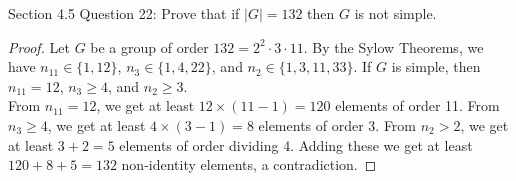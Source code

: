 Section 4.5 Question 22: Prove that if $|G|=132$ then $G$ is not simple.

\begin{proof}
  Let $G$ be a group of order $132=2^2\cdot3\cdot11$. By the Sylow
  Theorems, we have $n_{11}\in\{1,12\}$, $n_3\in\{1,4,22\}$, and
  $n_2\in\{1,3,11,33\}$. If $G$ is simple, then $n_{11}=12$, $n_3\geq4$,
  and $n_2\geq 3$. \\

  From $n_{11}=12$, we get at least $12\times(11-1)=120$ elements of order
  11. From $n_{3}\geq4$, we get at least $4\times(3-1)=8$ elements of
  order 3. From $n_{2}>2$, we get at least $3+2=5$ elements of
  order dividing 4. Adding these we get at least $120+8+5=132$ non-identity
  elements, a contradiction.
\end{proof}
